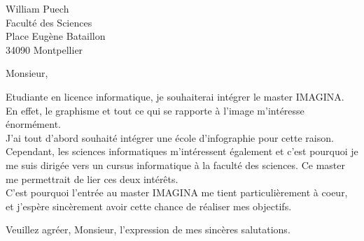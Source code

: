 \documentclass[11pt]{lettre}
\begin{document}
	\begin{letter}{William Puech \\ Faculté des Sciences \\ Place Eugène Bataillon \\ 34090 Montpellier}
		\makeatletter
   			\newcommand*{\NoRule}{\renewcommand*{\rule@length}{0}}
		\makeatother
		
		\NoRule
		\date{2 février 2017}
		\address{39 rue Robert Capa \\ 34090 Montpellier}
		\notelephone
		\nofax

    		\opening{Monsieur,}

    		Etudiante en licence informatique, je souhaiterai intégrer le master IMAGINA. En effet, le graphisme et 
    		tout ce qui se rapporte à l'image m'intéresse énormément. \\
    		J'ai tout d'abord souhaité intégrer une école d'infographie pour cette raison. Cependant, les sciences 
    		informatiques m'intéressent également et c'est pourquoi je me suis dirigée vers un cursus informatique
    		à la faculté des sciences. Ce master me permettrait de lier ces deux intérêts.\\
    		C'est pourquoi l'entrée au master IMAGINA me tient particulièrement à coeur, et j'espère sincèrement avoir
    		cette chance de réaliser mes objectifs.
    		
    		
    		\closing{Veuillez agréer, Monsieur, l'expression de mes sincères salutations.}

    		
    	\end{letter}
    	
\end{document}
